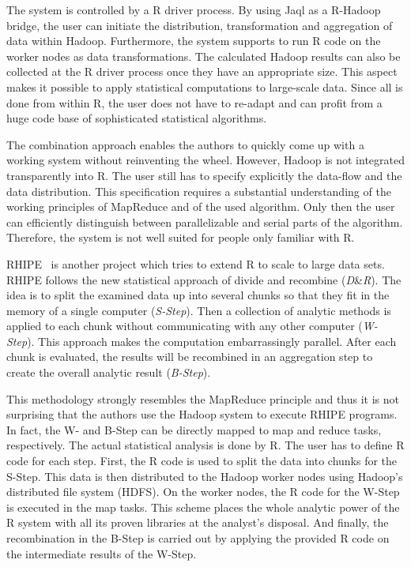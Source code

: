 The system is controlled by a R driver process.
By using Jaql as a R-Hadoop bridge, the user can initiate the distribution, transformation and aggregation of data within Hadoop.
Furthermore, the system supports to run R code on the worker nodes as data transformations.
The calculated Hadoop results can also be collected at the R driver process once they have an appropriate size.
This aspect makes it possible to apply statistical computations to large-scale data.
Since all is done from within R, the user does not have to re-adapt and can profit from a huge code base of sophisticated statistical algorithms.

The combination approach enables the authors to quickly come up with a working system without reinventing the wheel.
However, Hadoop is not integrated transparently into R.
The user still has to specify explicitly the data-flow and the data distribution.
This specification requires a substantial understanding of the working principles of MapReduce and of the used algorithm.
Only then the user can efficiently distinguish between parallelizable and serial parts of the algorithm.
Therefore, the system is not well suited for people only familiar with R.

RHIPE~\cite{guha:s2012a} is another project which tries to extend R to scale to large data sets.
RHIPE follows the new statistical approach of divide and recombine (\emph{D}\&\emph{R}).
The idea is to split the examined data up into several chunks so that they fit in the memory of a single computer (\emph{S-Step}).
Then a collection of analytic methods is applied to each chunk without communicating with any other computer (\emph{W-Step}).
This approach makes the computation embarrassingly parallel.
After each chunk is evaluated, the results will be recombined in an aggregation step to create the overall analytic result (\emph{B-Step}).

This methodology strongly resembles the MapReduce principle and thus it is not surprising that the authors use the Hadoop system to execute RHIPE programs.
In fact, the W- and B-Step can be directly mapped to map and reduce tasks, respectively.
The actual statistical analysis is done by R.
The user has to define R code for each step.
First, the R code is used to split the data into chunks for the S-Step.
This data is then distributed to the Hadoop worker nodes using Hadoop's distributed file system (HDFS).
On the worker nodes, the R code for the W-Step is executed in the map tasks.
This scheme places the whole analytic power of the R system with all its proven libraries at the analyst's disposal.
And finally, the recombination in the B-Step is carried out by applying the provided R code on the intermediate results of the W-Step.

